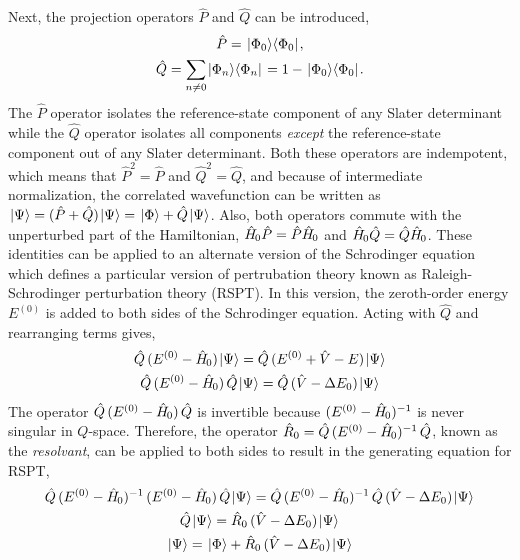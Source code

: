 \documentclass[thesis.tex]{subfiles}
\begin{document}
Next, the projection operators $\hat{P}$ and $\hat{Q}$ can be introduced,
\begin{gather}
  \hat{P} = \hspace{1pt}\lvert \Phi_{0} \rangle\langle \Phi_{0} |\hspace{1pt}, \\
  \hat{Q} = \sum_{n\neq 0}\hspace{1pt}\lvert \Phi_{n} \rangle\langle \Phi_{n} |\hspace{1pt} = 1 - \hspace{1pt}\lvert \Phi_{0} \rangle\langle \Phi_{0} |\hspace{1pt}.
\end{gather}
The $\hat{P}$ operator isolates the reference-state component of any Slater determinant while the $\hat{Q}$ operator isolates all components \textit{except} the reference-state component out of any Slater determinant.  Both these operators are indempotent, which means that $\hat{P}^{2} = \hat{P}$ and $\hat{Q}^{2} = \hat{Q}$, and because of intermediate normalization, the correlated wavefunction can be written as $\hspace{1pt}\lvert \Psi \rangle = \mathop{(\hat{P} + \hat{Q})}\hspace{1pt}\lvert \Psi \rangle = \hspace{1pt}\lvert \Phi \rangle + \hat{Q}\hspace{1pt}\lvert \Psi \rangle$.  Also, both operators commute with the unperturbed part of the Hamiltonian, $\hat{H}\hspace{-1.5pt}_{0}\hat{P} = \hat{P}\hat{H}\hspace{-1.5pt}_{0}$ and $\hat{H}\hspace{-1.5pt}_{0}\hat{Q} = \hat{Q}\hat{H}\hspace{-1.5pt}_{0}$.  These identities can be applied to an alternate version of the Schrodinger equation which defines a particular version of pertrubation theory known as Raleigh-Schrodinger perturbation theory (RSPT). In this version, the zeroth-order energy $E^{(0)}$ is added to both sides of the Schrodinger equation.  Acting with $\hat{Q}$ and rearranging terms gives,
\begin{gather}
  \hat{Q}\mathop{(E^{(0)} - \hat{H}\hspace{-1.5pt}_{0})}\hspace{1pt}\lvert \Psi \rangle = \hat{Q}\mathop{(E^{(0)} + \hat{V} - E)}\hspace{1pt}\lvert \Psi \rangle \notag \\
  \hat{Q}\mathop{(E^{(0)} - \hat{H}\hspace{-1.5pt}_{0})}\hat{Q}\hspace{1pt}\lvert \Psi \rangle = \hat{Q}\mathop{(\hat{V} - \Delta E_{0})}\hspace{1pt}\lvert \Psi \rangle
\end{gather}
The operator $\hat{Q}\mathop{(E^{(0)} - \hat{H}\hspace{-1.5pt}_{0})}\hat{Q}$ is invertible because $\mathop{(E^{(0)} - \hat{H}\hspace{-1.5pt}_{0})^{-1}}$ is never singular in $Q$-space.  Therefore, the operator $\hat{R}_{0} = \hat{Q}\mathop{(E^{(0)} - \hat{H}\hspace{-1.5pt}_{0})^{-1}}\hat{Q}$, known as the \textit{resolvant}, can be applied to both sides to result in the generating equation for RSPT,
\begin{gather}
  \hat{Q}\mathop{(E^{(0)} - \hat{H}\hspace{-1.5pt}_{0})^{-1}}\mathop{(E^{(0)} - \hat{H}\hspace{-1.5pt}_{0})}\hat{Q}\hspace{1pt}\lvert \Psi \rangle = \hat{Q}\mathop{(E^{(0)} - \hat{H}\hspace{-1.5pt}_{0})^{-1}}\hat{Q}\mathop{(\hat{V} - \Delta E_{0})}\hspace{1pt}\lvert \Psi \rangle \notag \\
  \hat{Q}\hspace{1pt}\lvert \Psi \rangle = \hat{R}_{0}\mathop{(\hat{V} - \Delta E_{0})}\hspace{1pt}\lvert \Psi \rangle \notag \\
  \hspace{1pt}\lvert \Psi \rangle = \hspace{1pt}\lvert \Phi \rangle + \hat{R}_{0}\mathop{(\hat{V} - \Delta E_{0})}\hspace{1pt}\lvert \Psi \rangle
\end{gather}
\end{document}
